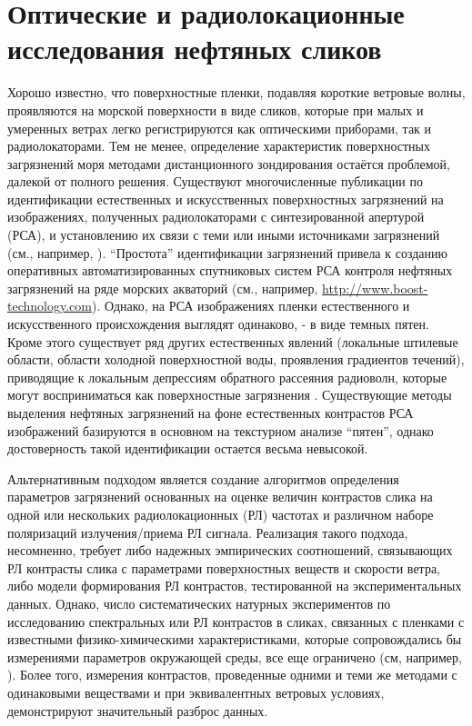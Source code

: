 \chapter{Оптические и радиолокационные исследования нефтяных сликов} \label{chap:2}


Хорошо известно, что поверхностные пленки, подавляя короткие ветровые волны, проявляются на морской поверхности в виде сликов, которые при малых и умеренных ветрах легко регистрируются как оптическими приборами, так и радиолокаторами. Тем не менее, определение характеристик поверхностных загрязнений моря методами дистанционного зондирования остаётся проблемой, далекой от полного решения.
Существуют многочисленные публикации по идентификации естественных и искусственных поверхностных загрязнений на изображениях, полученных радиолокаторами с синтезированной апертурой (РСА), и установлению их связи с теми или иными источниками загрязнений (см., например, \citep{Gade1998, Espedal1996, Espedal1998, Espedal2000}). ``Простота'' идентификации загрязнений привела к созданию оперативных автоматизированных спутниковых систем РСА контроля нефтяных загрязнений на ряде морских акваторий (см., например, \url{http://www.boost-technology.com}). Однако, на РСА изображениях пленки естественного и искусственного происхождения выглядят одинаково, - в виде темных пятен. Кроме этого существует ряд других естественных явлений (локальные штилевые области, области холодной поверхностной воды, проявления градиентов течений), приводящие к локальным депрессиям обратного рассеяния радиоволн, которые могут восприниматься как поверхностные загрязнения \citep{Espedal2000, Kudryavtsev2003}. Существующие методы выделения нефтяных загрязнений на фоне естественных контрастов РСА изображений базируются в основном на текстурном анализе ``пятен'', однако достоверность такой идентификации остается весьма невысокой.

Альтернативным подходом является создание алгоритмов определения параметров загрязнений основанных на оценке величин контрастов слика на одной или нескольких радиолокационных (РЛ) частотах \citep{Ermakov1987} и различном наборе поляризаций излучения/приема РЛ сигнала. Реализация такого подхода, несомненно, требует либо надежных эмпирических соотношений, связывающих РЛ контрасты слика с параметрами поверхностных веществ и скорости ветра, либо модели формирования РЛ контрастов, тестированной на экспериментальных данных. Однако, число систематических натурных экспериментов по исследованию спектральных или РЛ контрастов в сликах, связанных с пленками с известными физико-химическими характеристиками, которые сопровождались бы измерениями параметров окружающей среды, все еще ограничено (см, например, \citep{Ermakov1986, Ermakov1992, Gade1998, Gade1998b}). Более того, измерения контрастов, проведенные одними и теми же методами с одинаковыми веществами и при эквивалентных ветровых условиях, демонстрируют значительный разброс данных.

